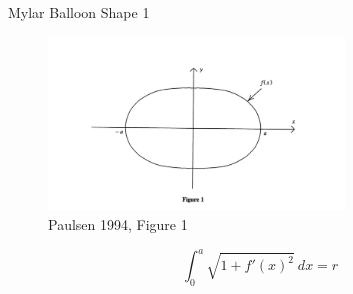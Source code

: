 \documentclass{beamer}
\begin{document}

\begin{frame}{Mylar Balloon Shape 1}


  \begin{figure}[!ht]
    \centering
    \includegraphics[width=0.7\textwidth]{paulsen_1994_figure_1.png}
    \caption{Paulsen 1994, Figure 1}
  \end{figure}

  \[
    \int_{0}^{a} \sqrt {1 + f'(x)^2}\ dx = r
  \]



\end{frame}
\end{document}
